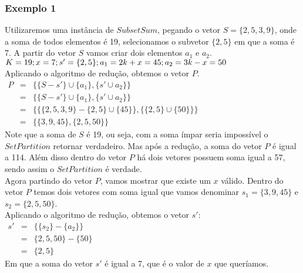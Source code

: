 \documentclass[12pt]{article}
\begin{document}
\subsubsection{Exemplo 1}
Utilizaremos uma instância de $SubsetSum$, pegando o vetor $S = \{2,5,3,9\}$, onde a soma de todos elementos é 19, selecionamos o subvetor $\{2,5\}$ em que a soma é 7. A partir do vetor $S$ vamos criar dois elementos $a_1$ e $a_2$.\\
$K = 19;\\x = 7;\\s' = \{2,5\};\\a_1 = 2k + x = 45;\\a_2 = 3k - x = 50$
\\
Aplicando o algoritmo de redução, obtemos o vetor $P$.
\\
$\begin{matrix}
P &=& \{\{S - s'\} \cup \{a_1\} , \{s' \cup a_2\}\}\\
\ &=& \{\{S - s'\} \cup \{a_1\} , \{s' \cup a_2\}\}\\
\ &=& \{\{\{2,5,3,9\} - \{2,5\} \cup \{45\}\} , \{\{2,5\} \cup \{50\}\}\}\\
\ &=& \{\{3,9,45\} , \{2,5,50\}\}
\end{matrix}$\\
Note que a soma de $S$ é 19, ou seja, com a soma ímpar seria impossível o $SetPartition$ retornar verdadeiro. Mas após a redução, a soma do vetor $P$ é igual a 114. Além disso dentro do vetor $P$ há dois vetores possuem soma igual a 57, sendo assim o $SetPartition$ é verdade.\\
Agora partindo do vetor $P$, vamos mostrar que existe um $x$ válido. Dentro do vetor $P$ temos dois vetores com soma igual que vamos denominar $s_1 = \{3,9,45\}$ e $s_2 = \{2,5,50\}$.\\
Aplicando o algoritmo de redução, obtemos o vetor $s'$:\\
$\begin{matrix}
s' &=& \{\{s_2\} - \{a_2\}\}\\
\ &=& \{2,5,50\} - \{50\}\\
\ &=& \{2,5\}
\end{matrix}$\\
Em que a soma do vetor $s'$ é igual a 7, que é o valor de $x$ que queríamos.
\end{document}
